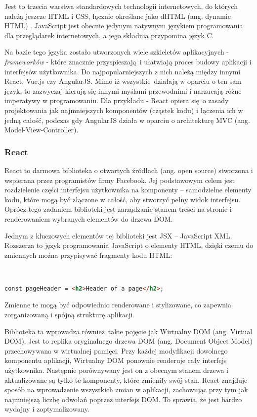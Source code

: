 \documentclass[12pt,twoside]{article}
\begin{document}
Jest to trzecia warstwa standardowych technologii internetowych, do których należą jeszcze HTML i CSS, łącznie określane jako dHTML (ang. dynamic HTML) \cite{JS}. JavaScript jest obecnie jedynym natywnym językiem programowania dla przeglądarek internetowych, a jego składnia przypomina język C. 

Na bazie tego języka zostało utworzonych wiele szkieletów aplikacyjnych - \emph{frameworków} -  które znacznie przyspieszają i ułatwiają proces budowy aplikacji i interfejsów użytkownika. Do najpopularniejszych z nich należą między innymi React, Vue.js czy AngularJS. Mimo iż wszystkie działają w oparciu o ten sam język, to zazwyczaj kierują się innymi myślami przewodnimi i narzucają różne imperatywy w programowaniu. Dla przykładu - React opiera się o zasady projektowania jak najmniejszych komponentów (cząstek kodu) i łączenia ich w jedną całość, podczas gdy AngularJS działa w oparciu o architekturę MVC (ang. Model-View-Controller).

\subsubsection{React}

React to darmowa biblioteka o otwartych źródłach (ang. open source) stworzona i wspierana przez programistów firmy Facebook. Jej podstawowym celem jest rozdzielenie części interfejsu użytkownika na komponenty -- samodzielne elementy kodu, które mogą być złączone w całość, aby stworzyć pełny widok interfejsu. Oprócz tego zadaniem biblioteki jest zarządzanie stanem treści na stronie i renderowaniem wybranych elementów do drzewa DOM. 

Jednym z kluczowych elementów tej biblioteki jest JSX -- JavaScript XML. Rozszerza to język programowania JavaScript o elementy HTML, dzięki czemu do zmiennych można przypisywać fragmenty kodu HTML:

\

\begin{lstlisting}[language=HTML,caption=Nagłówek strony w wykonany w składni JSX,label={KodJS}]
	const pageHeader = <h2>Header of a page</h2>;
\end{lstlisting}

Zmienne te mogą być odpowiednio renderowane i stylizowane, co zapewnia zorganizowaną i spójną strukturę aplikacji.

Biblioteka ta wprowadza również takie pojęcie jak Wirtualny DOM (ang. Virtual DOM). Jest to replika oryginalnego drzewa DOM (ang. Document Object Model) przechowywana w wirtualnej pamięci. Przy każdej modyfikacji dowolnego komponentu aplikacji, Wirtualny DOM ponownie renderuje cały interfejs użytkownika. Następnie porównywany jest on z obecnym stanem drzewa i aktualizowane są tylko te komponenty, które zmieniły swój stan. React znajduje sposób na wprowadzenie wszystkich zmian w aplikacji, zachowując przy tym jak najmniejszą liczbę odwołań poprzez interfejs DOM. To sprawia, że jest bardzo wydajny i zoptymalizowany.
\end{document}
